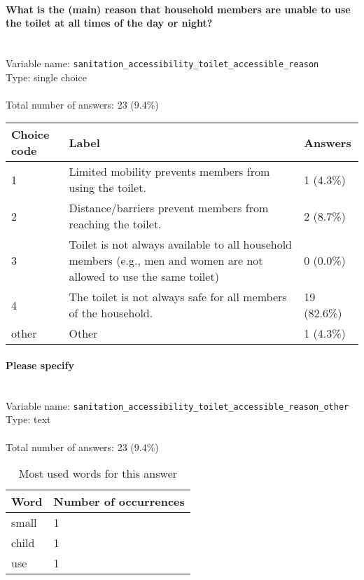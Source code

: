 \documentclass[11.5pt, a4paper]{scrartcl}
\begin{document}
\paragraph{What is the (main) reason that household members are unable to use the toilet at all times of the day or night? }
\  \\Variable name: \texttt{sanitation\_accessibility\_toilet\_accessible\_reason}\\
Type: single choice\\
\\Total number of answers: 23 (9.4\%)
\\[0.2em] \begin{tabular}{p{4cm}|p{8cm}|p{3cm}}
Choice code & Label & Answers \\
\hline
1 & Limited mobility prevents members from using the toilet.& \cellcolor{color0}1 (4.3\%)\\
\cellcolor{mygray} 2 & \cellcolor{mygray}Distance/barriers prevent members from reaching the toilet.  & \cellcolor{color0}2 (8.7\%)\\
3 & Toilet is not always available to all household members (e.g., men and women are not allowed to use the same toilet)& \cellcolor{color0}0 (0.0\%)\\
\cellcolor{mygray} 4 & \cellcolor{mygray}The toilet is not always safe for all members of the household. & \cellcolor{color4}19 (82.6\%)\\
other & Other& \cellcolor{color0}1 (4.3\%)\\
\end{tabular}
\paragraph{Please specify}
\  \\Variable name: \texttt{sanitation\_accessibility\_toilet\_accessible\_reason\_other}\\
Type: text\\
\\Total number of answers: 23 (9.4\%)
\\[0.2em]\begin{table}[H]
 \begin{tabular}{p{4cm}|p{8cm}}
Word & Number of occurrences  \\
\hline
\cellcolor{mygray}small&\cellcolor{mygray}1\\
\hline
child&1\\
\hline
\cellcolor{mygray}use&\cellcolor{mygray}1\\
\hline
\end{tabular}
\caption{\label{tab:table-name} Most used words for this answer}
\end{table}
\end{document}
